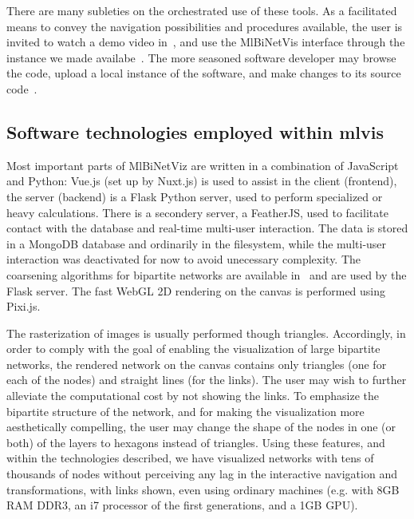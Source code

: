 \documentclass[runningheads]{llncs}
\begin{document}
There are many subleties on the orchestrated use of these tools.
As a facilitated means to convey the navigation possibilities and
procedures available, the user is invited to watch a demo video in~\cite{yvideo},
and use the MlBiNetVis interface through the instance we made availabe~\cite{mbnvpage}.
The more seasoned software developer may browse the code, upload a local instance
of the software, and make changes to its source code~\cite{mbnvcode}.

\subsection{Software technologies employed within mlvis}
Most important parts of MlBiNetViz are written in a combination of JavaScript and Python:
Vue.js (set up by Nuxt.js) is used to assist in the client (frontend),
the server (backend) is a Flask Python server, used to perform
specialized or heavy calculations.
There is a secondery server, a FeatherJS, used to facilitate contact with the database
and real-time multi-user interaction.
The data is stored in a MongoDB database and ordinarily in the filesystem,
while the multi-user interaction was deactivated for now to avoid unecessary complexity.
The coarsening algorithms for bipartite networks are available in~\cite{bialgs}
and are used by the Flask server.
The fast WebGL 2D rendering on the canvas is performed using Pixi.js.

The rasterization of images is usually performed though triangles.
Accordingly, in order to comply with the goal of enabling the visualization of large bipartite networks,
the rendered network on the canvas contains only triangles (one for each of the nodes) and straight lines (for the links).
The user may wish to further alleviate the computational cost by not showing the links.
To emphasize the bipartite structure of the network, and for making the visualization more aesthetically
compelling, the user may change the shape of the nodes in one (or both) of the layers to hexagons instead of triangles.
Using these features, and within the technologies described, we have visualized networks
with tens of thousands of nodes without perceiving any lag in the interactive navigation and transformations,
with links shown,
even using ordinary machines (e.g. with 8GB RAM DDR3, an i7 processor of the first generations, and a 1GB GPU).
\end{document}
